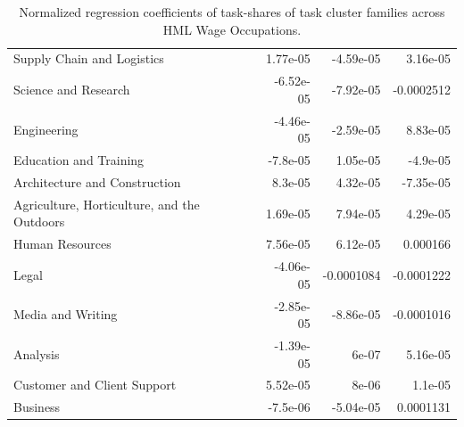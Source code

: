 \documentclass[letterpaper]{article} %
\begin{document}
\begin{table}[h!]
\begin{tabular}{l | r | r | r}
                  Supply Chain and Logistics &    1.77e-05 &   -4.59e-05 &    3.16e-05 \\
                        Science and Research &   -6.52e-05 &   -7.92e-05 &  -0.0002512 \\
                                 Engineering &   -4.46e-05 &   -2.59e-05 &    8.83e-05 \\
                      Education and Training &    -7.8e-05 &    1.05e-05 &    -4.9e-05 \\
               Architecture and Construction &     8.3e-05 &    4.32e-05 &   -7.35e-05 \\
 Agriculture, Horticulture, and the Outdoors &    1.69e-05 &    7.94e-05 &    4.29e-05 \\
                             Human Resources &    7.56e-05 &    6.12e-05 &    0.000166 \\
                                       Legal &   -4.06e-05 &  -0.0001084 &  -0.0001222 \\
                           Media and Writing &   -2.85e-05 &   -8.86e-05 &  -0.0001016 \\
                                    Analysis &   -1.39e-05 &       6e-07 &    5.16e-05 \\
                 Customer and Client Support &    5.52e-05 &       8e-06 &     1.1e-05 \\
                                    Business &    -7.5e-06 &   -5.04e-05 &   0.0001131 \\
\hline
\end{tabular}
\caption{Normalized regression coefficients of task-shares of task cluster families across HML Wage Occupations. 
\label{table:SCF_HML_coeff} }
\end{table}
\end{document}

